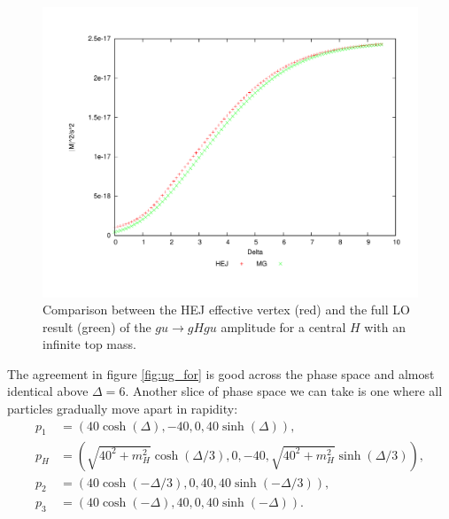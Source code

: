 \begin{figure}[t]
\centering
\includegraphics[scale=0.45]{Images/ug_cen.pdf}
\caption{Comparison between the HEJ effective vertex (red) and the full LO result (green) of the $gu \to gHgu$ amplitude for a central $H$ with an infinite top mass.}
\label{fig:ug_cen}
\end{figure}
The agreement in figure \ref{fig:ug_for} is good across the phase space and almost identical above $\Delta = 6$. Another slice of phase space we can take is one where all particles gradually move apart in rapidity:
\begin{subequations}
\begin{align}
p_1 &= (40 \cosh(\Delta),-40,0,40 \sinh(\Delta)), \\
p_H &= (\sqrt{40^2+m_H^2} \cosh(\Delta/3), 0,-40,\sqrt{40^2+m_H^2}  \sinh(\Delta/3)), \\
p_2 &= (40 \cosh(-\Delta/3),0,40,40 \sinh(-\Delta/3)), \\
p_3 &= (40 \cosh(-\Delta),40,0,40 \sinh(-\Delta)).
\end{align}
\end{subequations}
